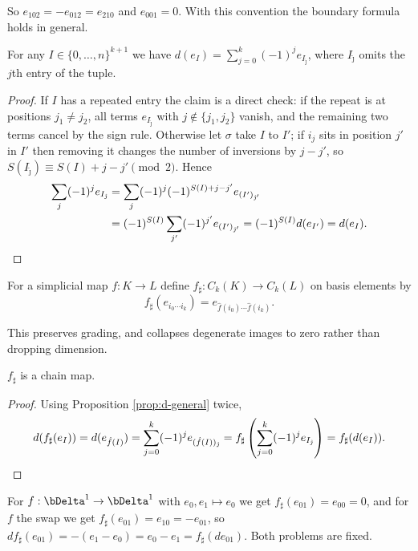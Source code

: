 So $e_{102} = -e_{012} = e_{210}$ and $e_{001} = 0$. With this convention the boundary
formula holds in general.

\begin{proposition} \label{prop:d-general}
	For any $I \in \{0,\dots,n\}^{k+1}$ we have $d(e_I) = \sum_{j=0}^k(-1)^je_{I_{\hat\jmath}}$, where $I_{\hat\jmath}$ omits the $j$th entry of the tuple.
\end{proposition}
\begin{proof}
	If $I$ has a repeated entry the claim is a direct check: if the repeat is at positions $j_1 \neq j_2$, all terms $e_{I_{\hat\jmath}}$ with $j \notin \{j_1,j_2\}$ vanish, and the remaining two terms cancel by the sign rule. Otherwise let $\sigma$ take $I$ to $I'$; if $i_j$ sits in position $j'$ in $I'$ then removing it changes the number of inversions by $j - j'$, so $S(I_{\hat\jmath}) \equiv S(I) + j - j' \pmod 2$. Hence
	\begin{align*}
	\sum_j (-1)^je_{I_{\hat\jmath}} &= \sum_j (-1)^{j}(-1)^{S(I)+j-j'}e_{(I')_{\hat\jmath'}} \\
	&= (-1)^{S(I)}\sum_{j'}(-1)^{j'}e_{(I')_{\hat\jmath'}} = (-1)^{S(I)}d(e_{I'}) = d(e_I). \qedhere
	\end{align*}
\end{proof}

\begin{definition}
	For a simplicial map $f: K \to L$ define $f_\sharp: C_k(K) \to C_k(L)$ on basis elements by
	$$
	f_\sharp(e_{i_0\cdots i_k}) = e_{\hat f(i_0)\cdots \hat f(i_k)} .
	$$
\end{definition}

This preserves grading, and collapses degenerate images to zero rather than dropping
dimension.

\begin{proposition}
	$f_\sharp$ is a chain map.
\end{proposition}
\begin{proof}
	Using Proposition \ref{prop:d-general} twice,
	$$
	d(f_\sharp(e_I)) = d(e_{\hat f(I)}) = \sum_{j=0}^k(-1)^je_{(\hat f(I))_{\hat\jmath}} = f_\sharp\left(\sum_{j=0}^k(-1)^je_{I_{\hat\jmath}}\right) = f_\sharp(d(e_I)). \qedhere
	$$
\end{proof}

\begin{example}
	For $f: \bDelta^1\to\bDelta^1$ with $e_0,e_1 \mapsto e_0$ we get $f_\sharp(e_{01}) = e_{00} = 0$, and for $f$ the swap we get $f_\sharp(e_{01}) = e_{10} = -e_{01}$, so $df_\sharp(e_{01}) = -(e_1-e_0) = e_0-e_1 = f_\sharp(d e_{01})$. Both problems are fixed.
\end{example}

